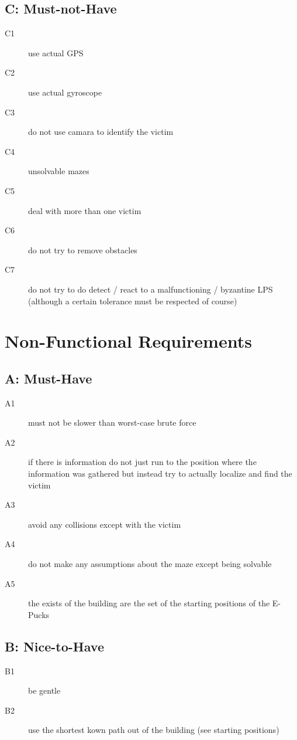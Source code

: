 \documentclass[a4paper,parskip,headheight=38pt]{scrartcl} %
\begin{document}
\subsection*{C: Must-not-Have}
\begin{description}
\item[C1] use actual GPS
\item[C2] use actual gyroscope
\item[C3] do not use camara to identify the victim
\item[C4] unsolvable mazes
\item[C5] deal with more than one victim
\item[C6] do not try to remove obstacles
\item[C7] do not try to do detect / react to a malfunctioning / byzantine LPS (although a certain tolerance must be respected of course)
\end{description}

\section{Non-Functional Requirements}
\subsection*{A: Must-Have}
\begin{description}
\item[A1] must not be slower than worst-case brute force
\item[A2] if there is information do not just run to the position where the information was gathered but instead try to actually localize and find the victim
\item[A3] avoid any collisions except with the victim
\item[A4] do not make any assumptions about the maze except being solvable
\item[A5] the exists of the building are the set of the starting positions of the E-Pucks
\end{description}

\subsection*{B: Nice-to-Have}
\begin{description}
\item[B1] be gentle
\item[B2] use the shortest kown path out of the building (see starting positions)
\end{description}
\end{document}
